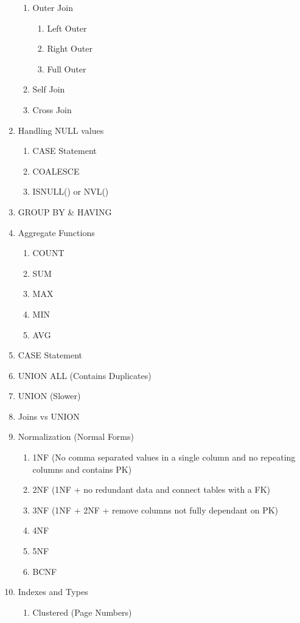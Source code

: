 \documentclass[11pt]{article}
\begin{document}
\begin{enumerate}
\begin{enumerate}
   	\item Outer Join
   	\begin{enumerate}
   		\item Left Outer
   		\item Right Outer
   		\item Full Outer 
   	\end{enumerate}
   \item Self Join
   \item Cross Join
   \end{enumerate}
    \item Handling NULL values
    \begin{enumerate}
    	\item CASE Statement
    	\item COALESCE
    	\item ISNULL() or NVL()
    \end{enumerate}
    \item GROUP BY \& HAVING
    \item Aggregate Functions
    \begin{enumerate}
    	\item COUNT
    	\item SUM
    	\item MAX
    	\item MIN
    	\item AVG
    \end{enumerate}
   \item CASE Statement
    \item UNION ALL (Contains Duplicates)
    \item UNION (Slower)
    \item Joins vs UNION
	\item Normalization (Normal Forms)
	\begin{enumerate}
		\item 1NF (No comma separated values in a single column and no repeating columns and contains PK)
		\item 2NF (1NF + no redundant data and connect tables with a FK)
		\item 3NF (1NF + 2NF + remove columns not fully dependant on PK)
		\item 4NF
		\item 5NF
		\item BCNF		
	\end{enumerate}
\item Indexes and Types
\begin{enumerate}
	\item Clustered (Page Numbers)

\end{enumerate}
\end{enumerate}
\end{document}
